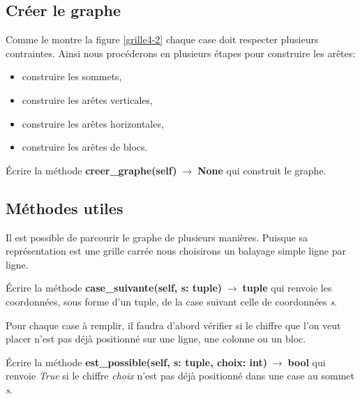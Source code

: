 \documentclass[a4paper,11pt]{article}
\begin{document}
\begin{Form}
\subsection{Créer le graphe}
Comme le montre la figure \ref{grille4-2} chaque case doit respecter plusieurs contraintes. Ainsi nous procéderons en plusieurs étapes pour construire les arêtes:
\begin{itemize}
\item construire les sommets,
\item construire les arêtes verticales,
\item construire les arêtes horizontales,
\item construire les arêtes de blocs.
\end{itemize}
\begin{activite}
Écrire la méthode \textbf{creer\_graphe(self)$\;\rightarrow\;$None} qui construit le graphe.
\end{activite}
\subsection{Méthodes utiles}
Il est possible de parcourir le graphe de plusieurs manières. Puisque sa représentation est une grille carrée nous choisirons un balayage simple ligne par ligne.
\begin{activite}
Écrire la méthode \textbf{case\_suivante(self, s: tuple)$\;\rightarrow\;$tuple} qui renvoie les coordonnées, sous forme d'un tuple, de la case suivant celle de coordonnées \emph{s}.
\end{activite}
Pour chaque case à remplir, il faudra d'abord vérifier si le chiffre que l'on veut placer n'est pas déjà positionné sur une ligne, une colonne ou un bloc.
\begin{activite}
Écrire la méthode \textbf{est\_possible(self, s: tuple, choix: int)$\;\rightarrow\;$bool} qui renvoie \emph{True} si le chiffre \emph{choix} n'est pas déjà positionné dans une case  au sommet \emph{s}.
\end{activite}

\end{Form}
\end{document}
